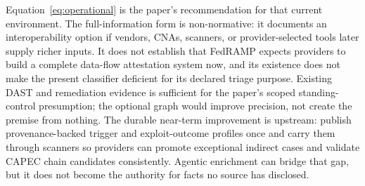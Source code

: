 \documentclass[11pt]{article}
\begin{document}
Equation~\ref{eq:operational} is the paper's recommendation for that current
environment. The full-information form is non-normative: it documents an
interoperability option if vendors, CNAs, scanners, or provider-selected tools
later supply richer inputs. It does not establish that FedRAMP expects
providers to build a complete data-flow attestation system now, and its
existence does not make the present classifier deficient for its declared
triage purpose. Existing DAST and remediation evidence is sufficient for the
paper's scoped standing-control presumption; the optional graph would improve
precision, not create the premise from nothing. The durable near-term
improvement is upstream: publish
provenance-backed trigger and exploit-outcome profiles once and carry them
through scanners so providers can promote exceptional indirect cases and
validate CAPEC chain candidates consistently. Agentic
enrichment can bridge that gap, but it does not become the authority for facts
no source has disclosed.
\end{document}
